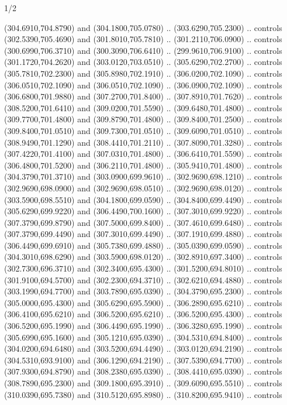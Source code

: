 \begin{flagdescription}{1/2}
\begin{scope}[xshift=0.5\flaglength]
\begin{scope}[scale=0.00745\flagwidth,xshift=-12.1mm,yshift=41.7mm]
\begin{scope}[y=0.80pt, x=0.80pt, yscale=-1, xscale=1, inner sep=0pt, outer sep=0pt]
\begin{scope}[cm={{1.33333,0.0,0.0,-1.33333,(0.0,114.66667)}}]
\begin{scope}[scale=0.100]
  (304.6910,704.8790) and (304.1800,705.0780) .. (303.6290,705.2300) .. controls
  (302.5390,705.4690) and (301.8010,705.7810) .. (301.2110,706.0900) .. controls
  (300.6990,706.3710) and (300.3090,706.6410) .. (299.9610,706.9100) .. controls
  (301.1720,704.2620) and (303.0120,703.0510) .. (305.6290,702.2700) .. controls
  (305.7810,702.2300) and (305.8980,702.1910) .. (306.0200,702.1090) .. controls
  (306.0510,702.1090) and (306.0510,702.1090) .. (306.0900,702.1090) .. controls
  (306.6800,701.9880) and (307.2700,701.8400) .. (307.8910,701.7620) .. controls
  (308.5200,701.6410) and (309.0200,701.5590) .. (309.6480,701.4800) .. controls
  (309.7700,701.4800) and (309.8790,701.4800) .. (309.8400,701.2500) .. controls
  (309.8400,701.0510) and (309.7300,701.0510) .. (309.6090,701.0510) .. controls
  (308.9490,701.1290) and (308.4410,701.2110) .. (307.8090,701.3280) .. controls
  (307.4220,701.4100) and (307.0310,701.4800) .. (306.6410,701.5590) .. controls
  (306.4800,701.5200) and (306.2110,701.4800) .. (305.9410,701.4800) .. controls
  (304.3790,701.3710) and (303.0900,699.9610) .. (302.9690,698.1210) .. controls
  (302.9690,698.0900) and (302.9690,698.0510) .. (302.9690,698.0120) .. controls
  (303.5900,698.5510) and (304.1800,699.0590) .. (304.8400,699.4490) .. controls
  (305.6290,699.9220) and (306.4490,700.1600) .. (307.3010,699.9220) .. controls
  (307.3790,699.8790) and (307.5000,699.8400) .. (307.4610,699.6480) .. controls
  (307.3790,699.4490) and (307.3010,699.4490) .. (307.1910,699.4880) .. controls
  (306.4490,699.6910) and (305.7380,699.4880) .. (305.0390,699.0590) .. controls
  (304.3010,698.6290) and (303.5900,698.0120) .. (302.8910,697.3400) .. controls
  (302.7300,696.3710) and (302.3400,695.4300) .. (301.5200,694.8010) .. controls
  (301.9100,694.5700) and (302.2300,694.3710) .. (302.6210,694.4880) .. controls
  (303.1990,694.7700) and (303.7890,695.0390) .. (304.3790,695.2300) .. controls
  (305.0000,695.4300) and (305.6290,695.5900) .. (306.2890,695.6210) .. controls
  (306.4100,695.6210) and (306.5200,695.6210) .. (306.5200,695.4300) .. controls
  (306.5200,695.1990) and (306.4490,695.1990) .. (306.3280,695.1990) .. controls
  (305.6990,695.1600) and (305.1210,695.0390) .. (304.5310,694.8400) .. controls
  (304.0200,694.6480) and (303.5200,694.4490) .. (303.0120,694.2190) .. controls
  (304.5310,693.9100) and (306.1290,694.2190) .. (307.5390,694.7700) .. controls
  (307.9300,694.8790) and (308.2380,695.0390) .. (308.4410,695.0390) .. controls
  (308.7890,695.2300) and (309.1800,695.3910) .. (309.6090,695.5510) .. controls
  (310.0390,695.7380) and (310.5120,695.8980) .. (310.8200,695.9410) .. controls

\end{scope}
\end{scope}
\end{scope}
\end{scope}
\end{scope}
\end{flagdescription}
